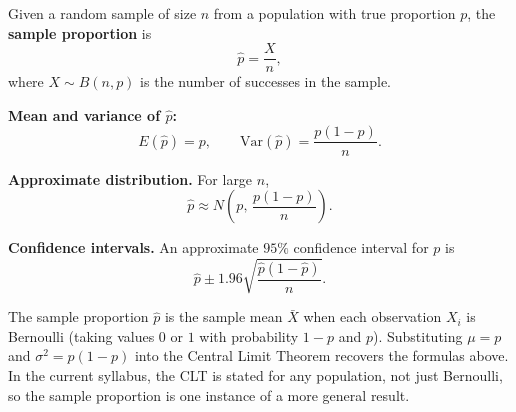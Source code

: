 
Given a random sample of size $n$ from a population with true proportion $p$, the \textbf{sample proportion} is
\[
\hat{p} = \frac{X}{n},
\]
where $X \sim B(n,p)$ is the number of successes in the sample.

\textbf{Mean and variance of $\hat{p}$:}
\[
E(\hat{p}) = p, \qquad \mathrm{Var}(\hat{p}) = \frac{p(1-p)}{n}.
\]

\textbf{Approximate distribution.} For large $n$,
\[
\hat{p} \approx N\!\left(p,\, \frac{p(1-p)}{n}\right).
\]

\textbf{Confidence intervals.} An approximate $95\%$ confidence interval for $p$ is
\[
\hat{p} \pm 1.96\sqrt{\frac{\hat{p}(1-\hat{p})}{n}}.
\]

\begin{remark}
The sample proportion $\hat{p}$ is the sample mean $\bar{X}$ when each
observation $X_i$ is Bernoulli (taking values $0$ or $1$ with probability
$1-p$ and $p$). Substituting $\mu = p$ and $\sigma^2 = p(1-p)$ into the
Central Limit Theorem recovers the formulas above. In the current syllabus,
the CLT is stated for any population, not just Bernoulli, so the sample
proportion is one instance of a more general result.
\end{remark}



